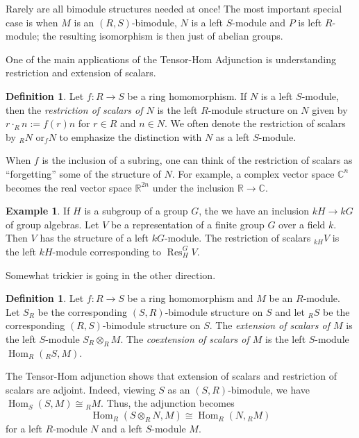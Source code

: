 \documentclass[12pt]{article}
\theoremstyle{plain}
\theoremstyle{definition}
\newtheorem{definition}[theorem]{Definition}
\newtheorem{example}[theorem]{Example}
\theoremstyle{remark}
\numberwithin{equation}{section}
\begin{document}
Rarely are all bimodule structures needed at once!
The most important special case is when $M$ is an $(R,S)$-bimodule,
$N$ is a left $S$-module and $P$ is left $R$-module;
the resulting isomorphism is then just of abelian groups.

One of the main applications of the Tensor-Hom Adjunction is
understanding restriction and extension of scalars.

\begin{definition}
Let $f : R \to S$ be a ring homomorphism.
If $N$ is a left $S$-module, then the \emph{restriction of scalars
of $N$} is the left $R$-module structure on $N$ given by
$r \cdot_R n := f(r)n$ for $r \in R$ and $n \in N$.
We often denote the restriction of scalars by ${}_RN$
or${}_fN$ to emphasize the distinction with $N$ as a left $S$-module.
\end{definition} 

When $f$ is the inclusion of a subring, one can think of the restriction
of scalars as ``forgetting'' some of the structure of $N$.
For example, a complex vector space $\mathbb{C}^n$ becomes the real
vector space $\mathbb{R}^{2n}$ under the inclusion $\mathbb{R} \to
\mathbb{C}$.

\begin{example}
If $H$ is a subgroup of a group $G$, the we have an inclusion
$kH \to kG$ of group algebras.
Let $V$ be a representation of a finite group $G$ over a field $k$.
Then $V$ has the structure of a left $kG$-module.
The restriction of scalars ${}_{kH}V$ is the left $kH$-module
corresponding to $\operatorname{Res}_H^G V$. 
\end{example}

Somewhat trickier is going in the other direction.

\begin{definition}
Let $f : R \to S$ be a ring homomorphism and $M$ be an $R$-module.
Let $S_R$ be the corresponding $(S,R)$-bimodule structure on $S$
and let ${}_RS$ be the corresponding $(R,S)$-bimodule structure on $S$.
The \emph{extension of scalars of $M$}
is the left $S$-module $S_R \otimes_R M$.
The \emph{coextension of scalars of $M$}
is the left $S$-module $\operatorname{Hom}_R({}_RS,M)$.
\end{definition}

The Tensor-Hom adjunction shows that extension of scalars
and restriction of scalars are adjoint.
Indeed, viewing $S$ as an $(S,R)$-bimodule,
we have $\operatorname{Hom}_S(S,M) \cong {}_RM$.
Thus, the adjunction becomes
\[
\operatorname{Hom}_R(S \otimes_R N,M)
\cong \operatorname{Hom}_R(N,{}_RM)
\]
for a left $R$-module $N$ and a left $S$-module $M$.
\end{document}
